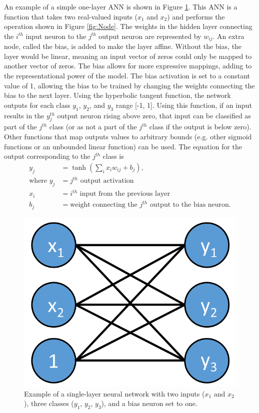 An example of a simple one-layer ANN is shown in Figure \ref{fig:one_layer_net}. This ANN is a function that takes two real-valued inputs ($x_1$ and $x_2$) and performs the operation shown in Figure \ref{fig:Node}. The weights in the hidden layer connecting the $i^{th}$ input neuron to the $j^{th}$ output neuron are represented by $w_{ij}$. An extra node, called the bias, is added to make the layer affine. Without the bias, the layer would be linear, meaning an input vector of zeros could only be mapped to another vector of zeros. The bias allows for more expressive mappings, adding to the representational power of the model. The bias activation is set to a constant value of 1, allowing the bias to be trained by changing the weights connecting the bias to the next layer. Using the hyperbolic tangent function, the network outputs for each class $y_1$, $y_2$, and $y_3$ range [-1, 1]. Using this function, if an input results in the $y_{j}^{th}$ output neuron rising above zero, that input can be classified as part of the ${j}^{th}$ class (or as not a part of the ${j}^{th}$ class if the output is below zero). Other functions that map outputs values to arbitrary bounds (e.g. other sigmoid functions or an unbounded linear function) can be used. The equation for the output corresponding to the $j^{th}$ class is 
%
\begin{align} \label{eq:single_layer_eq_sum}
y_j &= \tanh(\sum_i x_i w_{ij} + b_j), \\
\text{where } y_j &= j^{th} \text{ output activation} \nonumber \\
x_i &= i^{th} \text{ input from the previous layer} \nonumber \\
b_j &= \text{weight connecting the } j^{th} \text{ output to the bias neuron.} \nonumber
\end{align}
%
\begin{figure}[H]
	\centering
	\includegraphics[width=0.45\linewidth]{images/One_layer_net_v31}
	\caption{Example of a single-layer neural network with two inputs ($x_{1}$ and $x_{2}$), three classes ($y_{1}$, $y_{2}$, $y_{3}$), and a bias neuron set to one.}
	\label{fig:one_layer_net}
\end{figure}
